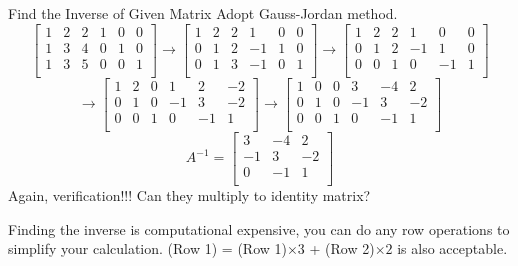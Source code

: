 \documentclass{beamer}
\begin{document}
\begin{frame}{Find the Inverse of Given Matrix}
    Adopt Gauss-Jordan method.
    \begin{equation*}
        \left[ \begin{matrix}
            1&		2&		2&		1&		0&		0\\
            1&		3&		4&		0&		1&		0\\
            1&		3&		5&		0&		0&		1\\
        \end{matrix} \right] \rightarrow \left[ \begin{matrix}
            1&		2&		2&		1&		0&		0\\
            0&		1&		2&		-1&		1&		0\\
            0&		1&		3&		-1&		0&		1\\
        \end{matrix} \right] \rightarrow \left[ \begin{matrix}
            1&		2&		2&		1&		0&		0\\
            0&		1&		2&		-1&		1&		0\\
            0&		0&		1&		0&		-1&		1\\
        \end{matrix} \right]
    \end{equation*}
    \begin{equation*}
        \rightarrow \left[ \begin{matrix}
            1&		2&		0&		1&		2&		-2\\
            0&		1&		0&		-1&		3&		-2\\
            0&		0&		1&		0&		-1&		1\\
        \end{matrix} \right] \rightarrow \left[ \begin{matrix}
            1&		0&		0&		3&		-4&		2\\
            0&		1&		0&		-1&		3&		-2\\
            0&		0&		1&		0&		-1&		1\\
        \end{matrix} \right]
    \end{equation*}
    \begin{equation*}
        A^{-1}=\left[ \begin{matrix}
            3&		-4&		2\\
            -1&		3&		-2\\
            0&		-1&		1\\
        \end{matrix} \right]
    \end{equation*}
Again, verification!!! Can they multiply to identity matrix?

\vspace{3pt}
Finding the inverse is computational expensive, you can do any row operations to simplify your calculation. (Row 1) = (Row 1)$\times 3$ + (Row 2)$\times 2$ is also acceptable.
\end{frame}
\end{document}
